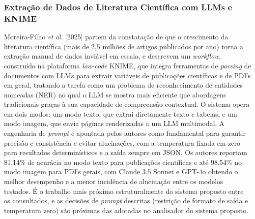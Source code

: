 \documentclass[12pt]{article}
\begin{document}
  \subsubsection{Extração de Dados de Literatura Científica com LLMs e KNIME}
  Moreira-Filho \emph{et al.} [2025] partem da constatação de que o crescimento da literatura científica (mais de 2,5 milhões de artigos publicados por ano) torna a extração manual de dados inviável em escala, e descrevem um \emph{workflow}, construído na plataforma \emph{low-code} KNIME, que integra ferramentas de \emph{parsing} de documentos com LLMs para extrair variáveis de publicações científicas e de PDFs em geral, tratando a tarefa como um problema de reconhecimento de entidades nomeadas (NER) no qual o LLM se mostra mais eficiente que abordagens tradicionais graças à sua capacidade de compreensão contextual. O sistema opera em dois modos: um modo texto, que extrai diretamente texto e tabelas, e um modo imagem, que envia páginas renderizadas a um LLM multimodal. A engenharia de \emph{prompt} é apontada pelos autores como fundamental para garantir precisão e consistência e evitar alucinações, com a temperatura fixada em zero para resultados determinísticos e a saída sempre em JSON. Os autores reportam 81,14\% de acurácia no modo texto para publicações científicas e até 98,54\% no modo imagem para PDFs gerais, com Claude 3.5 Sonnet e GPT-4o obtendo o melhor desempenho e a menor incidência de alucinação entre os modelos testados. É o trabalho mais próximo estruturalmente do sistema proposto entre os consultados, e as decisões de \emph{prompt} descritas (restrição de formato de saída e temperatura zero) são próximas das adotadas no analisador do sistema proposto.
\end{document}
